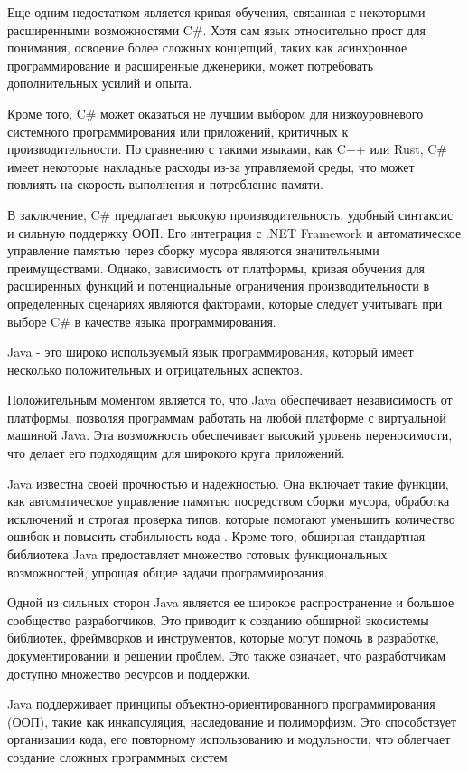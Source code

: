Еще одним недостатком является кривая обучения, связанная с некоторыми расширенными возможностями C\#. Хотя сам язык относительно прост для понимания, освоение более сложных концепций, таких как асинхронное программирование и расширенные дженерики, может потребовать дополнительных усилий и опыта.

Кроме того, C\# может оказаться не лучшим выбором для низкоуровневого системного программирования или приложений, критичных к производительности. По сравнению с такими языками, как C++ или Rust, C\# имеет некоторые накладные расходы из-за управляемой среды, что может повлиять на скорость выполнения и потребление памяти.

В заключение, C\# предлагает высокую производительность, удобный синтаксис и сильную поддержку ООП. Его интеграция с .NET Framework и автоматическое управление памятью через сборку мусора являются значительными преимуществами. Однако, зависимость от платформы, кривая обучения для расширенных функций и потенциальные ограничения производительности в определенных сценариях являются факторами, которые следует учитывать при выборе C\# в качестве языка программирования.

Java - это широко используемый язык программирования, который имеет несколько положительных и отрицательных аспектов.

Положительным моментом является то, что Java обеспечивает независимость от платформы, позволяя программам работать на любой платформе с виртуальной машиной Java. Эта возможность обеспечивает высокий уровень переносимости, что делает его подходящим для широкого круга приложений.

Java известна своей прочностью и надежностью. Она включает такие функции, как автоматическое управление памятью посредством сборки мусора, обработка исключений и строгая проверка типов, которые помогают уменьшить количество ошибок и повысить стабильность кода \cite{8}. Кроме того, обширная стандартная библиотека Java предоставляет множество готовых функциональных возможностей, упрощая общие задачи программирования.

Одной из сильных сторон Java является ее широкое распространение и большое сообщество разработчиков. Это приводит к созданию обширной экосистемы библиотек, фреймворков и инструментов, которые могут помочь в разработке, документировании и решении проблем. Это также означает, что разработчикам доступно множество ресурсов и поддержки.

Java поддерживает принципы объектно-ориентированного программирования (ООП), такие как инкапсуляция, наследование и полиморфизм. Это способствует организации кода, его повторному использованию и модульности, что облегчает создание сложных программных систем.


